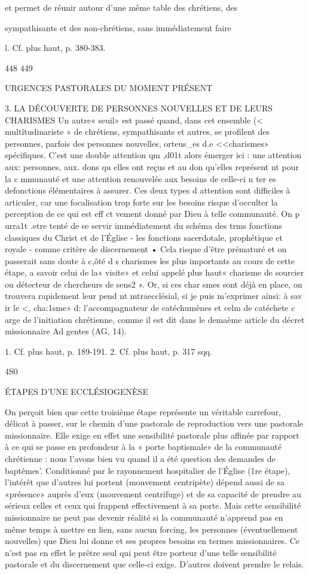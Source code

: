 {{et permet de réunir autour d'une même table des chrétiens, des		
 
sympathisants et des non-chrétiens, sans immédiatement faire
 
l. Cf. plus haut, p. 380-383.
 

448	449
 
URGENCES PASTORALES DU MOMENT PRÉSENT


3.	LA DÉCOUVERTE DE PERSONNES NOUVELLES ET DE LEURS CHARISMES
Un autre« seuil» est passé quand, dans cet ensemble (< multîtudinariste » de chrétiens, sympathisants et autres, se profilent des personnes, parfois des personnes nouvelles, orteus_es d.e
<<charismes» spécifiques. C'est une double attention qm ,d01t alors émerger ici : une attention aux: personnes, aux. dons qu elles ont reçus et au don qu'elles représent nt pour la c mmunauté et une attention renouvelée aux besoins de celle-ci n ter es defonctions élémentaires à assurer. Ces deux types d attention sont difficiles à articuler, car une focalisation trop forte sur les besoins risque d'occulter la perception de ce qui est eff ct vement donné par Dieu à telle communauté. On p urra1t .etre tenté de se servir immédiatement du schéma des trms fonctions classiques du Christ et de l'Église -	les fonctions sacerdotale, prophétique et royale -	comme critère de discernement • Cela risque d'être prématuré et on passerait sans doute à c,ôté d s charismes les plus importants au cours de cette étape, a savoir celui de la« visite» et celui appelé plus haut« charisme de sourcier ou détecteur de chercheurs de sens2 ». Or, si ces char smes sont déjà en place, on trouvera rapidement leur pend nt mtraecclésial, si je puis m'exprimer ainsi: à sav ir le <, cha:1sme» d: l'accompagnateur de catéchumènes et celm de catéchete c arge de l'initiation chrétienne, comme il est dit dans le demaème article du décret missionnaire Ad gentes (AG, 14).

1.	Cf. plus haut, p. 189-191.
2.	Cf. plus haut, p. 317 sqq.

4S0
 
ÉTAPES D'UNE ECCLÉSIOGENÈSE

On perçoit bien que cette troisième étape représente un véritable carrefour, délicat à passer, sur le chemin d'une pastorale de reproduction vers une pastorale missionnaire. Elle exige en effet une sensibilité pastorale plus affinée par rapport à ce qui se passe en profondeur à la « porte baptismale» de la communauté chrétienne : nous l'avons bien vu quand il a été question des demandes de baptêmes'. Conditionné par le rayonnement hospitalier de l'Église (1re étape), l'intérêt que d'autres lui portent (mouvement centripète) dépend aussi de sa «présence» auprès d'eux (mouvement centrifuge) et de sa capacité de prendre au sérieux celles et ceux qui frappent effectivement à sa porte. Mais cette sensibilité missionnaire ne peut pas devenir réalité si la communauté n'apprend pas en même temps à mettre en lien, sans aucun forcing, les personnes (éventuellement nouvelles) que Dieu lui donne et ses propres besoins en termes missionnaires. Ce n'est pas en effet le prêtre seul qui peut être porteur d'une telle sensibilité pastorale et du discernement que celle-ci exige. D'autres doivent prendre le relais.

}}

